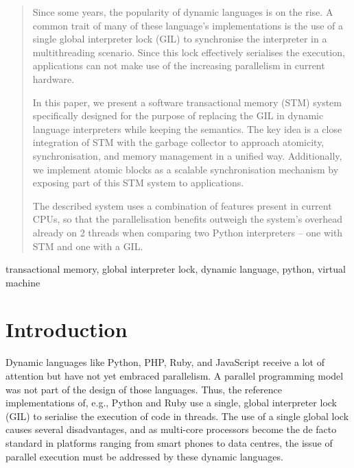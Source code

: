 \documentclass{sigplanconf}
\begin{document}
\begin{abstract}

Since some years, the popularity of dynamic languages is on the rise.
A common trait of many of these language's implementations is the use of
a single global interpreter lock (GIL) to synchronise the interpreter
in a multithreading scenario. Since this lock effectively serialises
the execution, applications can not make use of the increasing parallelism in
current hardware.

In this paper, we present a software transactional memory (STM) system
specifically designed for the purpose of replacing the GIL in dynamic
language interpreters while keeping the semantics. The key idea is a
close integration of STM with the garbage collector to approach
atomicity, synchronisation, and memory management in a unified
way. Additionally, we implement atomic blocks as a scalable
synchronisation mechanism by exposing part of this STM system to
applications.

The described system uses a combination of features present in current
CPUs, so that the parallelisation benefits outweigh the system's
overhead already on 2 threads when comparing two Python interpreters
-- one with STM and one with a GIL.


\end{abstract}



\keywords
transactional memory, global interpreter lock, dynamic language,
python, virtual machine


\section{Introduction}


Dynamic languages like Python, PHP, Ruby, and JavaScript receive a lot
of attention but have not yet embraced parallelism. A parallel
programming model was not part of the design of those languages. Thus,
the reference implementations of, e.g., Python and Ruby use a single,
global interpreter lock (GIL) to serialise the execution of code in
threads. The use of a single global lock causes several disadvantages,
and as multi-core processors become the de facto standard in platforms
ranging from smart phones to data centres, the issue of parallel
execution must be addressed by these dynamic languages.
\end{document}
